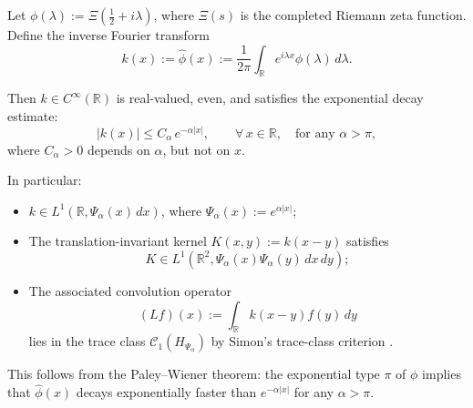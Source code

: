 \begin{lemma}
\label{lem:decay_inverse_fourier_xi}
Let \( \phi(\lambda) := \Xi\left( \tfrac{1}{2} + i\lambda \right) \), where \( \Xi(s) \) is the completed Riemann zeta function. Define the inverse Fourier transform
\[
k(x) := \widehat{\phi}(x) := \frac{1}{2\pi} \int_{\mathbb{R}} e^{i\lambda x} \phi(\lambda)\, d\lambda.
\]

Then \( k \in C^\infty(\mathbb{R}) \) is real-valued, even, and satisfies the exponential decay estimate:
\[
|k(x)| \le C_\alpha\, e^{-\alpha |x|}, \qquad \forall\, x \in \mathbb{R},\quad \text{for any } \alpha > \pi,
\]
where \( C_\alpha > 0 \) depends on \( \alpha \), but not on \( x \).

\medskip
\noindent In particular:
\begin{itemize}
    \item \( k \in L^1(\mathbb{R}, \Psi_\alpha(x)\, dx) \), where \( \Psi_\alpha(x) := e^{\alpha |x|} \);
    \item The translation-invariant kernel \( K(x,y) := k(x - y) \) satisfies
    \[
    K \in L^1(\mathbb{R}^2, \Psi_\alpha(x)\Psi_\alpha(y)\, dx\, dy);
    \]
    \item The associated convolution operator
    \[
    (Lf)(x) := \int_{\mathbb{R}} k(x - y) f(y)\, dy
    \]
    lies in the trace class \( \mathcal{C}_1(H_{\Psi_\alpha}) \) by Simon’s trace-class criterion \cite[Thm.~4.2]{Simon2005TraceIdeals}.
\end{itemize}

\noindent
This follows from the Paley–Wiener theorem: the exponential type \( \pi \) of \( \phi \) implies that \( \widehat{\phi}(x) \) decays exponentially faster than \( e^{-\alpha |x|} \) for any \( \alpha > \pi \).
\end{lemma}
